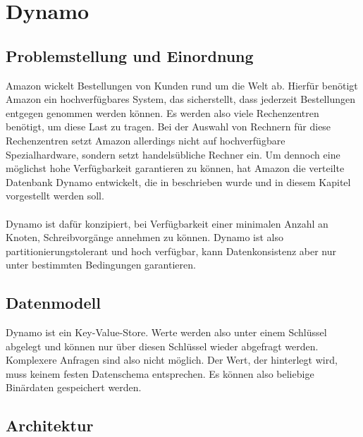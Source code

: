 \chapter{Dynamo}
\label{appendiceC}


\section{Problemstellung und Einordnung}
Amazon wickelt Bestellungen von Kunden rund um die Welt ab. Hierfür benötigt Amazon ein hochverfügbares System, das sicherstellt, dass jederzeit Bestellungen entgegen genommen werden können. Es werden also viele Rechenzentren benötigt, um diese Last zu tragen. Bei der Auswahl von Rechnern für diese Rechenzentren setzt Amazon allerdings nicht auf hochverfügbare Spezialhardware, sondern setzt handelsübliche Rechner ein. Um dennoch eine möglichst hohe Verfügbarkeit garantieren zu können, hat Amazon die verteilte Datenbank Dynamo entwickelt, die in \cite{dynamo} beschrieben wurde und in diesem Kapitel vorgestellt werden soll. \\ 
\\
Dynamo ist dafür konzipiert, bei Verfügbarkeit einer minimalen Anzahl an Knoten, Schreibvorgänge annehmen zu können. Dynamo ist also partitionierungstolerant und hoch verfügbar, kann Datenkonsistenz aber nur unter bestimmten Bedingungen garantieren. 
\section{Datenmodell}
Dynamo ist ein Key-Value-Store. Werte werden also unter einem Schlüssel abgelegt und können nur über diesen Schlüssel wieder abgefragt werden. Komplexere Anfragen sind also nicht möglich. Der Wert, der hinterlegt wird, muss keinem festen Datenschema entsprechen. Es können also beliebige Binärdaten gespeichert werden.

\section{Architektur}

